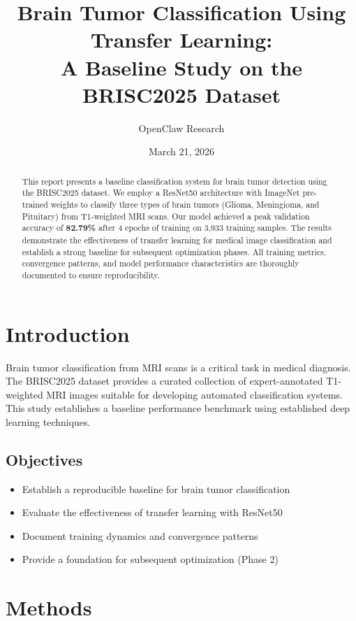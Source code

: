 \documentclass[11pt,a4paper]{article}
\title{\textbf{Brain Tumor Classification Using Transfer Learning:}\\
\large A Baseline Study on the BRISC2025 Dataset}
\author{OpenClaw Research}
\date{March 21, 2026}
\begin{document}
\maketitle

\begin{abstract}
This report presents a baseline classification system for brain tumor detection using the BRISC2025 dataset. We employ a ResNet50 architecture with ImageNet pre-trained weights to classify three types of brain tumors (Glioma, Meningioma, and Pituitary) from T1-weighted MRI scans. Our model achieved a peak validation accuracy of \textbf{82.79\%} after 4 epochs of training on 3,933 training samples. The results demonstrate the effectiveness of transfer learning for medical image classification and establish a strong baseline for subsequent optimization phases. All training metrics, convergence patterns, and model performance characteristics are thoroughly documented to ensure reproducibility.
\end{abstract}

\section{Introduction}

Brain tumor classification from MRI scans is a critical task in medical diagnosis. The BRISC2025 dataset provides a curated collection of expert-annotated T1-weighted MRI images suitable for developing automated classification systems. This study establishes a baseline performance benchmark using established deep learning techniques.

\subsection{Objectives}
\begin{itemize}
    \item Establish a reproducible baseline for brain tumor classification
    \item Evaluate the effectiveness of transfer learning with ResNet50
    \item Document training dynamics and convergence patterns
    \item Provide a foundation for subsequent optimization (Phase 2)
\end{itemize}

\section{Methods}
\end{document}
